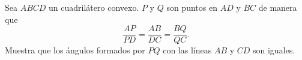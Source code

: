 Sea $ABCD$ un cuadrilátero convexo. $P$ y $Q$ son puntos en $AD$ y $BC$ de manera que 
\[\frac{AP}{PD}=\frac{AB}{DC}=\frac{BQ}{QC}.\] 
Muestra que los ángulos formados por $PQ$ con las líneas $AB$ y $CD$ son iguales.